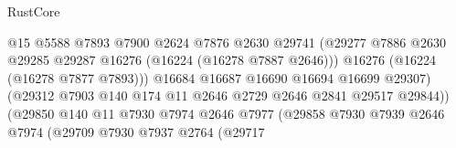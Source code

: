 \begin{lexlean}{RustCore}
\begin{coremodule}
                                              @15
                                              @5588
                                              @7893
                                              @7900
                                              @2624
                                              @7876
                                              @2630
                                              @29741
                                              (@29277
                                                @7886
                                                @2630
                                                @29285
                                                @29287
                                                @16276
                                                (@16224 (@16278 @7887 @2646)))
                                              @16276
                                              (@16224 (@16278 @7877 @7893)))
                                            @16684
                                            @16687
                                            @16690
                                            @16694
                                            @16699
                                            @29307)
                                          (@29312
                                            @7903
                                            @140
                                            @174
                                            @11
                                            @2646
                                            @2729
                                            @2646
                                            @2841
                                            @29517
                                            @29844))
                                        (@29850
                                          @140
                                          @11
                                          @7930
                                          @7974
                                          @2646
                                          @7977
                                          (@29858
                                            @7930
                                            @7939
                                            @2646
                                            @7974
                                            (@29709
                                              @7930
                                              @7937
                                              @2764
                                              (@29717

\end{coremodule}
\end{lexlean}

